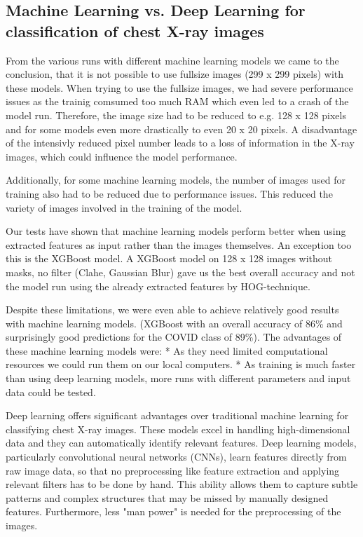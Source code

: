 \documentclass{article}
\begin{document}

\subsection{Machine Learning vs. Deep Learning for classification of chest X-ray images}

From the various runs with different machine learning models we came to the conclusion, that it is not possible to use fullsize images (299 x 299 pixels) with these models. 
When trying to use the fullsize images, we had severe performance issues as the trainig comsumed too much RAM which even led to a crash of the model run. Therefore, the image size had to be reduced to e.g. 128 x 128 pixels and for some models even more drastically to even 20 x 20 pixels. A disadvantage of the intensivly reduced pixel number leads to a loss of information in the X-ray images, which could influence the model performance. 

Additionally, for some machine learning models, the number of images used for training also had to be reduced due to performance issues. This reduced the variety of images involved in the training of the model. 

Our tests have shown that machine learning models perform better when using extracted features as input rather than the images themselves. An exception too this is the XGBoost model. A XGBoost model on 128 x 128 images without masks, no filter (Clahe, Gaussian Blur) gave us the best overall accuracy and not the model run using the already extracted features by HOG-technique. 

Despite these limitations, we were even able to achieve relatively good results with machine learning models. (XGBoost with an overall accuracy of 86\% and surprisingly good predictions for the COVID class of 89\%). 
The advantages of these machine learning models were: 
* As they need limited computational resources we could run them on our local computers.
* As training is much faster than using deep learning models, more runs with different parameters and input data could be tested. 

Deep learning offers significant advantages over traditional machine learning for classifying chest X-ray images. These models excel in handling high-dimensional data and they can automatically identify relevant features. Deep learning models, particularly convolutional neural networks (CNNs), learn features directly from raw image data, so that no preprocessing like feature extraction and applying relevant filters has to be done by hand. This ability allows them to capture subtle patterns and complex structures that may be missed by manually designed features. Furthermore, less "man power" is needed for the preprocessing of the images. 
\end{document}
